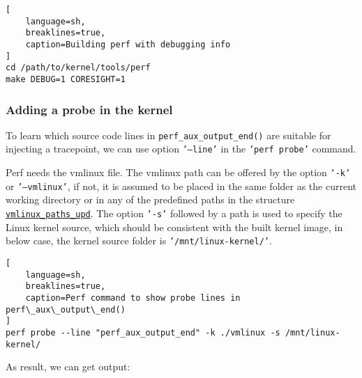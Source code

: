\documentclass[11pt]{diazessay} %
\def\code#1{\texttt{#1}}
\begin{document}
\begin{lstlisting}[
  	language=sh,
	breaklines=true,
	caption=Building perf with debugging info
]
cd /path/to/kernel/tools/perf
make DEBUG=1 CORESIGHT=1
\end{lstlisting}

\subsubsection*{Adding a probe in the kernel}

To learn which source code lines in \code{perf\_aux\_output\_end()} are
suitable for injecting a tracepoint, we can use option \code{'---line'} in the
\code{'perf probe'} command.

Perf needs the vmlinux file. The vmlinux path can be offered by the option
\code{'-k'} or \code{'---vmlinux'}, if not, it is assumed to be placed in the
same folder as the current working directory or in any of the predefined paths
in the structure
\href{https://git.kernel.org/pub/scm/linux/kernel/git/torvalds/linux.git/tree/tools/perf/util/symbol.c?h=v6.8-rc1#n2246}{\code{vmlinux\_paths\_upd}}.
The option \code{'-s'} followed by a path is used to specify the Linux kernel
source, which should be consistent with the built kernel image, in below case,
the kernel source folder is \code{'/mnt/linux-kernel/'}.

\begin{lstlisting}[
  	language=sh,
	breaklines=true,
	caption=Perf command to show probe lines in perf\_aux\_output\_end()
]
perf probe --line "perf_aux_output_end" -k ./vmlinux -s /mnt/linux-kernel/
\end{lstlisting}

As result, we can get output:
\end{document}
